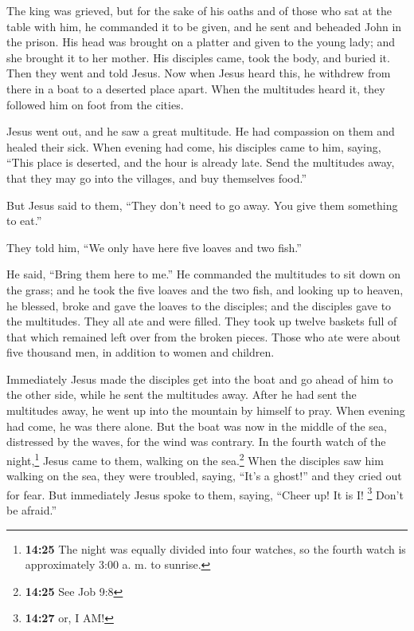  The king was grieved, but for the sake of his oaths and
of those who sat at the table with him, he commanded it to be given,
 and he sent and beheaded John in the prison.
 His head was brought on a platter and given to the young
lady; and she brought it to her mother.  His disciples
came, took the body, and buried it. Then they went and told Jesus.
 Now when Jesus heard this, he withdrew from there in a
boat to a deserted place apart. When the multitudes heard it, they
followed him on foot from the cities.

 Jesus went out, and he saw a great multitude. He had
compassion on them and healed their sick.  When evening
had come, his disciples came to him, saying, ``This place is deserted,
and the hour is already late. Send the multitudes away, that they may go
into the villages, and buy themselves food.''

 But Jesus said to them, ``They don't need to go away.
You give them something to eat.''

 They told him, ``We only have here five loaves and two
fish.''

 He said, ``Bring them here to me.''  He
commanded the multitudes to sit down on the grass; and he took the five
loaves and the two fish, and looking up to heaven, he blessed, broke and
gave the loaves to the disciples; and the disciples gave to the
multitudes.  They all ate and were filled. They took up
twelve baskets full of that which remained left over from the broken
pieces.  Those who ate were about five thousand men, in
addition to women and children.

 Immediately Jesus made the disciples get into the boat
and go ahead of him to the other side, while he sent the multitudes
away.  After he had sent the multitudes away, he went up
into the mountain by himself to pray. When evening had come, he was
there alone.  But the boat was now in the middle of the
sea, distressed by the waves, for the wind was contrary. 
In the fourth watch of the night,\footnote{\textbf{14:25} The night was
  equally divided into four watches, so the fourth watch is
  approximately 3:00 a. m. to sunrise.} Jesus came to them, walking on
the sea.\footnote{\textbf{14:25} See Job 9:8}  When the
disciples saw him walking on the sea, they were troubled, saying, ``It's
a ghost!'' and they cried out for fear.  But immediately
Jesus spoke to them, saying, ``Cheer up! It is I! \footnote{\textbf{14:27}
  or, I AM!} Don't be afraid.''

